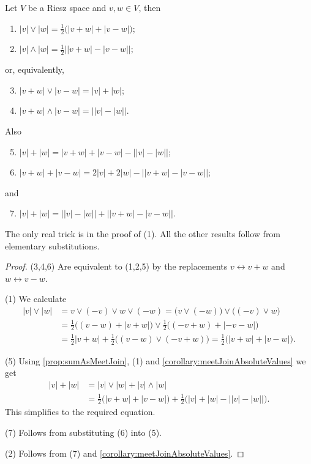 \begin{proposition}
Let $V$ be a Riesz space and $v,w\in V$, then
\begin{enumerate}
\item $|v|\vee |w| = \frac{1}{2}\Big( |v+w| + |v - w| \Big)$;
\item $|v|\wedge |w| = \frac{1}{2}\Big| |v+w| - |v - w| \Big|$;
\end{enumerate}
or, equivalently,
\begin{enumerate} \setcounter{enumi}{2}
\item $|v+w|\vee |v-w| = |v| + |w|$;
\item $|v+w|\wedge |v-w| = \big| |v| - |w| \big|$.
\end{enumerate}
Also
\begin{enumerate} \setcounter{enumi}{4}
\item $|v|+|w| = |v+w| + |v-w| - \big||v|-|w|\big|$;
\item $|v+w|+|v-w| = 2|v| + 2|w| - \big||v+w|-|v-w|\big|$;
\end{enumerate}
and
\begin{enumerate} \setcounter{enumi}{6}
\item $|v|+|w| = \big||v|-|w|\big| + \big||v+w|-|v-w|\big|$.
\end{enumerate}
\end{proposition}
The only real trick is in the proof of (1). All the other results follow from elementary substitutions.
\begin{proof}
(3,4,6) Are equivalent to (1,2,5) by the replacements $v \leftrightarrow v+w$ and $w \leftrightarrow v-w$.

(1) We calculate
\begin{align*}
|v|\vee |w| &= v\vee (-v)\vee w \vee (-w) = \big(v\vee(-w)\big)\vee \big((-v)\vee w\big) \\
&= \frac{1}{2}\Big((v-w) + |v + w|\Big)\vee \frac{1}{2}\Big( (-v+w) + |- v - w| \Big) \\
&= \frac{1}{2}|v+ w| + \frac{1}{2}\big((v-w)\vee (-v+w)\big) = \frac{1}{2}\Big( |v+w| + |v - w| \Big).
\end{align*}

(5) Using \ref{prop:sumAsMeetJoin}, (1) and \ref{corollary:meetJoinAbsoluteValues} we get
\begin{align*}
|v|+|w| &= |v|\vee|w| + |v|\wedge |w| \\
&= \frac{1}{2}\Big( |v+w| + |v - w| \Big) + \frac{1}{2}\Big(|v|+|w| - \big||v| - |w|\big|\Big).
\end{align*}
This simplifies to the required equation.

(7) Follows from substituting (6) into (5).

(2) Follows from (7) and \ref{corollary:meetJoinAbsoluteValues}.
\end{proof}
